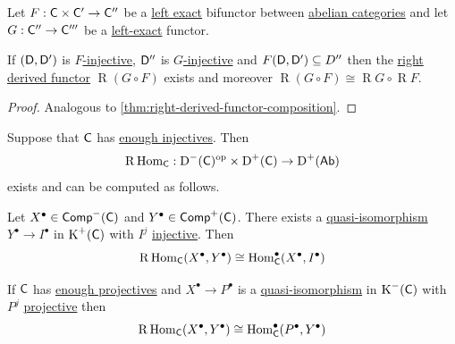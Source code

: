 \documentclass[../../main]{subfiles}
\begin{document}
\begin{proposition}
  Let \(F: \category{C} \times \category{C'} \to \category{C''}\) be a \hyperref[def:exact-functor]{left exact} bifunctor between \hyperref[def:abelian-category]{abelian categories} and let \(G: \category{C''} \to \category{C'''}\) be a \hyperref[def:exact-functor]{left-exact} functor.

  If \((\category{D}, \category{D'})\) is \hyperref[def:F-injective-bifunctor]{\(F\)-injective}, \(\category{D''}\) is \hyperref[def:F-injective-subcategory]{\(G\)-injective} and \(F(\category{D}, \category{D'}) \subseteq D''\) then the \hyperref[def:right-derived-bifunctor]{right derived functor} \(\operatorname{R}(G \circ F)\) exists and moreover \(\operatorname{R}(G \circ F) \cong \operatorname{R}G \circ \operatorname{R}F\).
\end{proposition}
\begin{proof}
  Analogous to \autoref{thm:right-derived-functor-composition}.
\end{proof}

\begin{example}
  Suppose that \(\category{C}\) has \hyperref[def:enough-injectives-projectives]{enough injectives}.
  Then
  \begin{equation*}
    \operatorname{R}\Hom_{\category{C}}: \operatorname{D}^{-}(\category{C})^{\op} \times \operatorname{D}^{+}(\category{C}) \to \operatorname{D}^{+}(\Ab)
  \end{equation*}
  exists and can be computed as follows.

  Let \(X^{\bullet} \in \Complex[-]{\category{C}}\) and \(Y^{\bullet} \in \Complex[+]{\category{C}}\).
  There exists a \hyperref[def:quasi-isomorphism]{quasi-isomorphism} \(Y^{\bullet} \to I^{\bullet}\) in \(\operatorname{K}^{+}(\category{C})\) with \(I^{j}\) \hyperref[def:injective-projective-object]{injective}.
  Then
  \begin{equation*}
    \operatorname{R}\Hom_{\category{C}}(X^{\bullet}, Y^{\bullet}) \cong \Hom_{\category{C}}^{\bullet}(X^{\bullet}, I^{\bullet})
  \end{equation*}

  If \(\category{C}\) has \hyperref[def:enough-injectives-projectives]{enough projectives} and \(X^{\bullet} \to P^{\bullet}\) is a \hyperref[def:quasi-isomorphism]{quasi-isomorphism} in \(\operatorname{K}^{-}(\category{C})\) with \(P^{j}\) \hyperref[def:injective-projective-object]{projective} then
  \begin{equation*}
    \operatorname{R}\Hom_{\category{C}}(X^{\bullet}, Y^{\bullet}) \cong \Hom_{\category{C}}^{\bullet}(P^{\bullet}, Y^{\bullet})
  \end{equation*}
\end{example}
\end{document}
